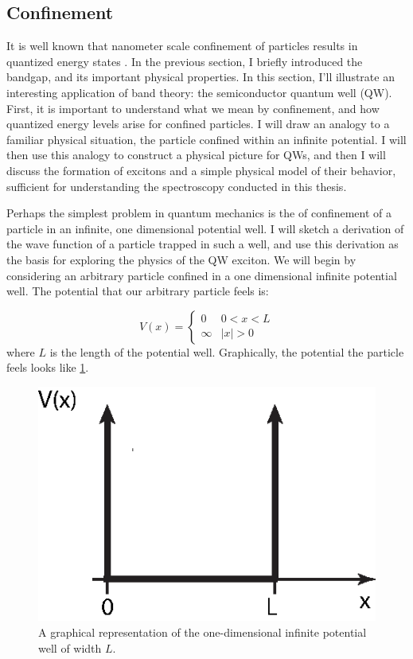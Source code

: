 \newpage
\subsection{Confinement}
\indent It is well known that nanometer scale confinement of particles results in quantized energy states \cite{griffiths}. In the previous section, I briefly introduced the bandgap, and its important physical properties. In this section, I'll illustrate an interesting application of band theory: the semiconductor quantum well (QW). First, it is important to understand what we mean by confinement, and how quantized energy levels arise for confined particles. I will draw an analogy to a familiar physical situation, the particle confined within an infinite potential. I will then use this analogy to construct a physical picture for QWs, and then I will discuss the formation of excitons and a simple physical model of their behavior, sufficient for understanding the spectroscopy conducted in this thesis.

\indent Perhaps the simplest problem in quantum mechanics is the of confinement of a particle in an infinite, one dimensional potential well. I will sketch a derivation of the wave function of a particle trapped in such a well, and use this derivation as the basis for exploring the physics of the QW exciton. We will begin by considering an arbitrary particle confined in a one dimensional infinite potential well. The potential that our arbitrary particle feels is:

\[ V(x) = \begin{cases} 
      0 & 0 < x < L \\
      \infty & |x| > 0 
   \end{cases}
\]
where $L$ is the length of the potential well. Graphically, the potential the particle feels looks like \ref{infp}.

\begin{figure}[h!]
\label{infp}
\centering
\includegraphics[width = .6\textwidth]{infpotential.eps}
\caption{\doublespacing A graphical representation of the one-dimensional infinite potential well of width $L$.}
\end{figure}

